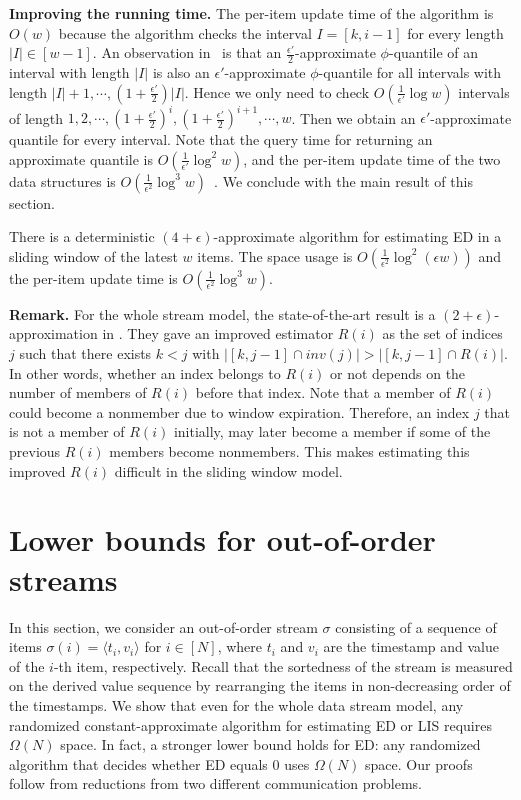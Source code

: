 \documentclass{llncs}
\newcommand{\runtitle}[1]{{\small \textbf{\boldmath #1}}}
\begin{document}
\vspace{.1in}
\runtitle{Improving the running time.}  The per-item update time of the algorithm is $O(w)$
because the algorithm checks the interval $I = [k, i-1]$ for every length $|I| \in [w-1]$.
An observation in~\cite{ErJ08} is that an $\frac{\epsilon'}{2}$-approximate
$\phi$-quantile of an interval with length $|I|$ is also an $\epsilon'$-approximate $\phi$-quantile
for all intervals with length $|I|+1, \cdots, (1+\frac{\epsilon'}{2})|I|$. Hence we only need to check
$O(\frac{1}{\epsilon'} \log w)$ intervals of length $1,2,\cdots,(1+\frac{\epsilon'}{2})^i,(1+\frac{\epsilon'}{2})^{i+1},\cdots,w$.
Then we obtain an
$\epsilon'$-approximate quantile for every interval.
Note that the query time for returning an approximate quantile
is $O(\frac{1}{\epsilon'} \log^2 w)$,
and the per-item update time of the two data structures is
$O(\frac{1}{\epsilon^2}\log ^3 w)$~\cite{CKT08,LLX+04}.
We conclude with the main result of this section.



\begin{theorem}
There is a deterministic $(4+\epsilon)$-approximate algorithm
for estimating ED in a sliding window of the latest $w$ items.
The space usage is $O(\frac{1}{\epsilon^2}\log ^2(\epsilon w))$
and the per-item update time is
$O(\frac{1}{\epsilon^2}\log ^3 w)$.
\end{theorem}

\runtitle{Remark.} For the whole stream model, the state-of-the-art result is a
$(2+\epsilon)$-approximation in \cite{ErJ08}.  They gave an improved estimator
$R(i)$ as the set
of indices $j$ such that there exists $k < j$ with $|[k,j-1]\cap inv(j)| >
|[k,j-1]\cap R(i)|$. In other words, whether an index belongs to $R(i)$ or not
depends on the number of members of $R(i)$ before that index.  Note that
a member of $R(i)$ could become a nonmember due to window expiration.  Therefore, an
index $j$ that is not a member of $R(i)$ initially, may later become a member
if some of the previous $R(i)$ members become nonmembers.  This makes estimating
this improved $R(i)$ difficult in the sliding window model.

\section{Lower bounds for out-of-order streams}\label{sec:extensions}

In this section, we consider an out-of-order stream $\sigma$
consisting of a sequence of items $\sigma(i) = \langle t_i, v_i\rangle$ for $i\in[N]$,
where $t_i$ and $v_i$ are the timestamp and
value of the $i$-th item, respectively.
Recall that the sortedness of the stream is
measured on the derived value sequence by rearranging the items in
non-decreasing order of the timestamps. 
We show that even for the whole data stream model,
any randomized constant-approximate algorithm
for estimating ED or LIS requires $\Omega(N)$ space. 
In fact, a stronger lower bound holds for ED: any randomized algorithm that decides 
whether ED equals 0 uses $\Omega(N)$ space.  Our proofs follow from reductions from
two different communication problems.
\end{document}
